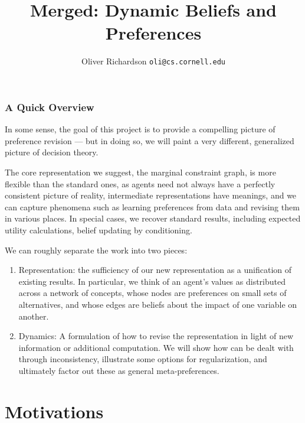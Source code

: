 \documentclass{article}
\title{Merged: Dynamic Beliefs and Preferences}
\author{Oliver Richardson  \texttt{oli@cs.cornell.edu}}
\begin{document}
	\maketitle
	
	\section*{A Quick Overview}
	In some sense, the goal of this project is to provide a compelling picture of preference revision --- but in doing so, we will paint a very different, generalized picture of decision theory. 
	
	The core representation we suggest, the marginal constraint graph, is more flexible than the standard ones, as agents need not always have a perfectly consistent picture of reality, intermediate representations have meanings, and we can capture phenomena such as learning preferences from data and revising them in various places. In special cases, we recover standard results, including expected utility calculations, belief updating by conditioning.
	
	We can roughly separate the work into two pieces:
	\begin{enumerate}%
		\item Representation: the sufficiency of our new representation as a unification of existing results. In particular, we think of an agent's values as distributed across a network of concepts, whose nodes are preferences on small sets of alternatives, and whose edges are beliefs about the impact of one variable on another.
		\item Dynamics: A formulation of how to revise the representation in light of new information or additional computation. We will show how can be dealt with through inconsistency, illustrate some options for regularization, and ultimately factor out these as general meta-preferences. 
	\end{enumerate}

	\tableofcontents
	\clearpage
	\part{Motivations}
\end{document}
